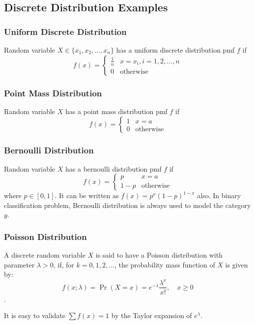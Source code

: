 \documentclass[11pt]{article}
\begin{document}
\subsection{Discrete Distribution Examples}
\subsubsection{Uniform Discrete Distribution}
Random variable $X \in \{x_1, x_2, ..., x_n\}$ has a uniform discrete distribution pmf $f$ if 
\[f(x) = \left\{\begin{array}{cc}
\frac{1}{n}  &  x = x_i, i = 1, 2, ..., n \\
0                &  \text{otherwise}
\end{array}
\right.\] 

\subsubsection{Point Mass Distribution}
Random variable $X$ has a point mass distribution pmf $f$ if 
\[f(x) = \left\{\begin{array}{cc}
1 & x= a \\
0 & \text{otherwise}
\end{array}
\right.
\]

\subsubsection{Bernoulli Distribution}
Random variable $X$ has a bernoulli distribution pmf $f$ if 
\[f(x) = \left\{\begin{array}{cc}
p & x= a \\
1-p & \text{otherwise}
\end{array}
\right.
\]
where $p \in [0,1]$. It can be written as $f(x)=p^x(1-p)^{1-x}$ also. In binary classification problem, Bernoulli distribution is always used to model the category $y$.

\subsubsection{Poisson Distribution}
A discrete random variable $X$ is said to have a Poisson distribution with parameter $\lambda > 0$, 
if, for $k = 0, 1, 2, ...$, the probability mass function of $X$ is given by:
\[f(x; \lambda) = \Pr(X=x)= e^{-\lambda} \frac{\lambda^x }{x!},\quad x\ge 0\].

It is easy to validate $\sum{f(x)}=1$ by the Taylor expansion of $e^\lambda$.
\end{document}
